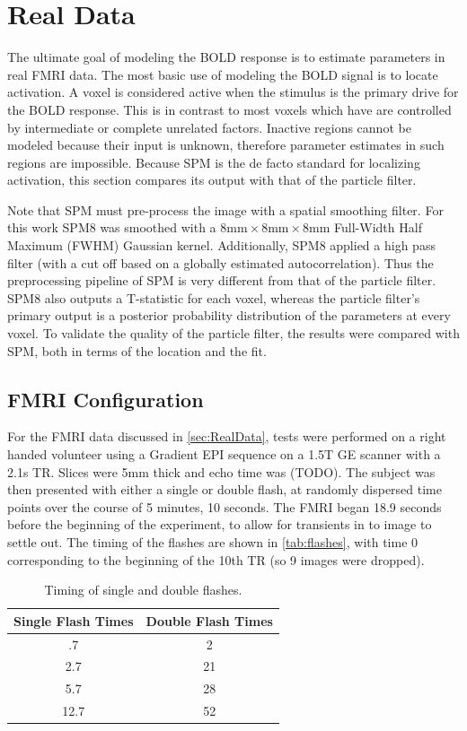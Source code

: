 \chapter{Real Data}
\label{sec:RealData}
The ultimate goal of modeling the BOLD response is to estimate parameters
in real FMRI data. The most basic use of modeling the BOLD signal is to
locate activation. A voxel is considered active when the stimulus 
is the primary drive for the BOLD response. This is in contrast to 
most voxels which have are controlled by intermediate or complete unrelated factors. 
Inactive regions cannot be modeled because their input is unknown, therefore
parameter estimates in such regions are impossible. 
Because SPM is the de facto standard for localizing activation,
this section compares its output with that of the particle filter.

Note that SPM must pre-process the image with a spatial smoothing 
filter. For this work SPM8 was smoothed with a
$8\text{mm} \times  8\text{mm} \times 8\text{mm}$ Full-Width Half Maximum
(FWHM) Gaussian kernel.  
Additionally, SPM8 applied a high pass filter (with a cut
off based on a globally estimated autocorrelation). Thus the preprocessing pipeline
of SPM is very different from that of the particle filter. SPM8 also outputs
a T-statistic for each voxel, whereas the 
particle filter's primary output is a posterior probability distribution of the parameters
at every voxel. To validate the quality of the particle filter, the results 
were compared with SPM, both in terms of the location and the fit.

\section{FMRI Configuration}
For the FMRI data discussed in \autoref{sec:RealData}, tests were 
performed on a right handed volunteer using a Gradient EPI sequence
on a 1.5T GE scanner with a 2.1s TR. Slices were 5mm thick and echo
time was (TODO). The subject was then presented with either a single or
double flash, at randomly dispersed time points over the course of
5 minutes, 10 seconds. The FMRI began 18.9 seconds
before the beginning of the experiment, to allow for transients 
in to image to settle out. The timing of the flashes are shown in 
\autoref{tab:flashes}, with time 0 corresponding to the beginning of
the 10th TR (so 9 images were dropped). 

\begin{table}[t]
\centering
\begin{tabular}{|c || c |}
\hline 
Single Flash Times & Double Flash Times \\
\hline 
.7 & 2\\
2.7 & 21\\
5.7 & 28\\
12.7 & 52\\
\hline 
\end{tabular}
\caption{Timing of single and double flashes.}
\label{tab:flashes} 
\end{table}

